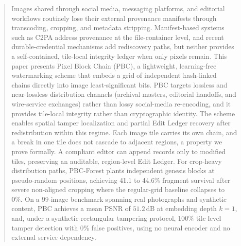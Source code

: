 \documentclass[conference]{IEEEtran}
\begin{document}
\maketitle
\begin{abstract}
Images shared through social media, messaging platforms, and editorial workflows routinely lose their external provenance manifests through transcoding, cropping, and metadata stripping. Manifest-based systems such as C2PA address provenance at the file-container level, and recent durable-credential mechanisms add rediscovery paths, but neither provides a self-contained, tile-local integrity ledger when only pixels remain. This paper presents Pixel Block Chain (PBC), a lightweight, learning-free watermarking scheme that embeds a grid of independent hash-linked chains directly into image least-significant bits. PBC targets lossless and near-lossless distribution channels (archival masters, editorial handoffs, and wire-service exchanges) rather than lossy social-media re-encoding, and it provides tile-local integrity rather than cryptographic identity. The scheme enables spatial tamper localization and partial Edit Ledger recovery after redistribution within this regime. Each image tile carries its own chain, and a break in one tile does not cascade to adjacent regions, a property we prove formally. A compliant editor can append records only to modified tiles, preserving an auditable, region-level Edit Ledger.
For crop-heavy distribution paths, PBC-Forest plants independent genesis blocks at pseudo-random positions, achieving 41.1 to 44.6\% fragment survival after severe non-aligned cropping where the regular-grid baseline collapses to 0\%. On a 99-image benchmark spanning real photographs and synthetic content, PBC achieves a mean PSNR of $51.2$\,dB at embedding depth $k{=}1$, and, under a synthetic rectangular tampering protocol, 100\% tile-level tamper detection with 0\% false positives, using no neural encoder and no external service dependency.
\end{abstract}
\end{document}
